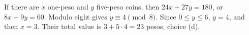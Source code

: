 If there are $x$ one-peso and $y$ five-peso coins, then $24x+27y=180$, or $8x+9y=60$. Modulo eight gives $y\equiv4\pmod8$. Since $0\le y\le6$, $y=4$, and then $x=3$. Their total value is $3+5\cdot4=\boxed{23}$ pesos, choice (d).
